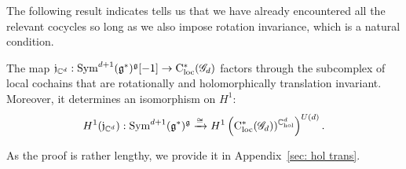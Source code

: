 The following result indicates tells us that we have already encountered all the relevant cocycles so long as we also impose rotation invariance, which is a natural condition.

\begin{prop}
\label{prop: trans j}
The map $\mathfrak j_{\mathbb C^d} :  {\rm Sym}^{d+1}(\mathfrak g^*)^\mathfrak g [-1] \to {\rm C}_{\rm loc}^*(\mathscr G_{d})$ factors through the  subcomplex of local cochains that are rotationally and holomorphically translation invariant.
Moreover, it determines an isomorphism on $H^1$:
\[
H^1(\mathfrak j_{\mathbb C^d}) : {\rm Sym}^{d+1}(\mathfrak g^*)^\mathfrak g \xrightarrow{\cong} H^1 \left({\rm C}_{\rm loc}^*(\mathscr G_d))^{\mathbb C^{d}_{\rm hol}}\right)^{U(d)} .
\]
\end{prop}

As the proof is rather lengthy, we provide it in Appendix~\ref{sec: hol trans}.

